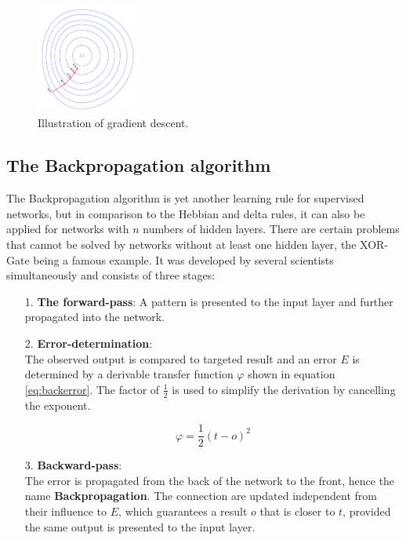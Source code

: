 \documentclass[10pt,a4paper,DIV=11]{scrreprt}
\begin{document}
\begin{figure}[H]

    \centering
    \includegraphics[width=0.3\textwidth,scale=1]{files/graddes.png}  
    \caption{Illustration of gradient descent.\cite{GRADFIG}}
    \label{fig:grad}
\end{figure}

\subsection{The Backpropagation algorithm}

The Backpropagation algorithm is yet another learning rule for supervised networks, but in comparison to the Hebbian and delta rules, it can also be applied for networks with $n$ 
numbers of hidden layers. There are certain problems that cannot be solved by networks without at least one hidden layer, the XOR-Gate being a famous example. 
It was developed by several scientists simultaneously \cite{BACK1}\cite{BACK2}\cite{BACK3} and consists of three stages:
\begin{itemize}
\item[1.] \textbf{The forward-pass}:
A pattern is presented to the input layer and further propagated into the network.
\item[2.] \textbf{Error-determination}:\\
The observed output is compared to targeted result and an error $E$ is determined by a derivable transfer function $\varphi$ shown in equation \eqref{eq:backerror}. The factor of $\frac{1}{2}$ is used to simplify the derivation by cancelling the exponent.

\begin{equation}
\varphi = \frac{1}{2} (t-o)^2
\label{eq:backerror}
\end{equation}
\item[3.] \textbf{Backward-pass}:\\
The error is propagated from the back of the network to the front, hence the name \textbf{Backpropagation}. The connection are updated independent from their influence to $E$, 
which guarantees a result $o$ that is closer to $t$, provided the same output is presented to the input layer.
\end{itemize}
\end{document}
